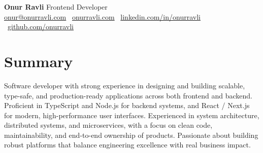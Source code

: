 \documentclass[10pt,a4paper]{extarticle}
\begin{document}
\begin{center}
    \begin{minipage}{\textwidth}
        \centering
        {\LARGE\textbf{Onur Ravli}} \hspace{2pt} {\LARGE{Frontend Developer}}\\[10pt]
        \href{mailto:onur@onurravli.com}{onur@onurravli.com} \textbullet\
        \href{https://onurravli.com}{onurravli.com} \textbullet\
        \href{https://linkedin.com/in/onurravli}{linkedin.com/in/onurravli} \textbullet\
        \href{https://github.com/onurravli}{github.com/onurravli}
    \end{minipage}
\end{center}
\section{Summary}
Software developer with strong experience in designing and building scalable, type-safe, and production-ready applications across both frontend and backend. Proficient in TypeScript and Node.js for backend systems, and React / Next.js for modern, high-performance user interfaces. Experienced in system architecture, distributed systems, and microservices, with a focus on clean code, maintainability, and end-to-end ownership of products. Passionate about building robust platforms that balance engineering excellence with real business impact.
\end{document}
